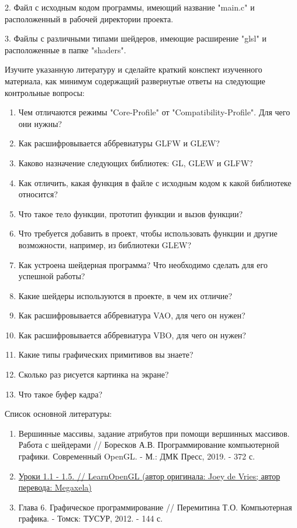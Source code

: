 \documentclass[a4paper,12pt]{article}
\begin{document}
    2. Файл с исходным кодом программы, имеющий название "main.c" и расположенный в рабочей директории проекта.
    
    3. Файлы с различными типами шейдеров, имеющие расширение "glsl" и расположенные в папке "shaders".
    
    
    
    Изучите указанную литературу и сделайте краткий конспект изученного материала, как минимум содержащий развернутые ответы на следующие контрольные вопросы:
    \begin{enumerate}
    \item Чем отличаются режимы "Core-Profile" от "Compatibility-Profile". Для чего они нужны?
    \item Как расшифровывается аббревиатуры GLFW и GLEW?
    \item Каково назначение следующих библиотек: GL, GLEW и GLFW? 
    \item Как отличить, какая функция в файле с исходным кодом к какой библиотеке относится?
    \item Что такое тело функции, прототип функции и вызов функции?
    \item Что требуется добавить в проект, чтобы использовать функции и другие возможности, например, из библиотеки GLEW?
    \item Как устроена шейдерная программа? Что необходимо сделать для его успешной работы?
    \item Какие шейдеры используются в проекте, в чем их отличие?
    \item Как расшифровывается аббревиатура VAO, для чего он нужен?
    \item Как расшифровывается аббревиатура VBO, для чего он нужен?
    \item Какие типы графических примитивов вы знаете?
    \item Сколько раз рисуется картинка на экране?
    \item Что такое буфер кадра?
    \end{enumerate}
    
    
    
    Список основной литературы:
    
    \begin{enumerate}
        \item 
        Вершинные массивы, задание атрибутов при помощи вершинных массивов. Работа с шейдерами // Боресков А.В. Программирование компьютерной графики. Современный OpenGL. - М.: ДМК Пресс, 2019. - 372 с.
        \item 
        \href{https://habr.com/ru/post/310790/}{Уроки 1.1 - 1.5. // LearnOpenGL (автор оригинала: Joey de Vries; автор перевода: Megaxela)} 
        
        \item
        Глава 6. Графическое программирование // Перемитина Т.О. Компьютерная графика. - Томск: ТУСУР, 2012. - 144 с.
        
        \end{enumerate}
\end{document}
